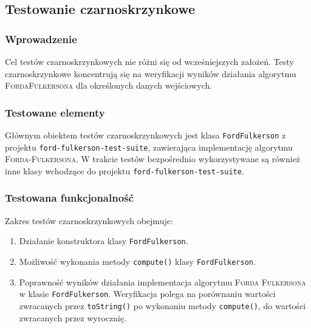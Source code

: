\subsection{Testowanie czarno\dywiz skrzynkowe}

\subsubsection{Wprowadzenie}
Cel testów czarno\dywiz skrzynkowych nie różni się od wcześniejszych założeń.
Testy czarno\dywiz skrzynkowe koncentrują się na weryfikacji wyników działania
algorytmu \textsc{Forda\dywiz Fulkersona} dla określonych danych wejściowych.

\subsubsection{Testowane elementy}
Głównym obiektem testów czarno\dywiz skrzynkowych jest klasa
\texttt{FordFulkerson} z projektu \texttt{ford-fulkerson-test-suite},
zawierająca implementację algorytmu \textsc{Forda-Fulkersona}. W trakcie testów
bezpośrednio wykorzystywane są również inne klasy wchodzące do projektu
\texttt{ford-fulkerson-test-suite}.

\subsubsection{Testowana funkcjonalność}
Zakres testów czarno\dywiz skrzynkowych obejmuje:
\begin{enumerate}
    \item Działanie konstruktora klasy \texttt{FordFulkerson}.
    \item Możliwość wykonania metody \texttt{compute()} klasy \texttt{FordFulkerson}.
    \item Poprawność wyników działania implementacja algorytmu \textsc{Forda\dywiz
        Fulkersona} w klasie \texttt{FordFulkerson}. Weryfikacja polega na
        porównaniu wartości zwracanych przez \texttt{toString()} po wykonaniu
        metody \texttt{compute()}, do wartości zwracanych przez wyrocznię.
\end{enumerate}

